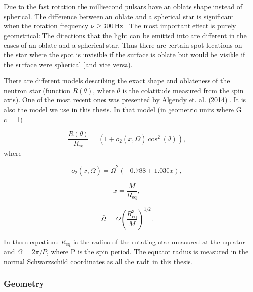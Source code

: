 \documentclass{wihuri}
\begin{document}
Due to the fast rotation the millisecond pulsars have an oblate shape instead of spherical. The difference between an oblate and a spherical star is significant when the rotation frequency $\nu \ge 300 \, \mathrm{Hz}$ \cite{cadeau}%
. The most important effect is purely geometrical: The directions that the light can be emitted into are different in the cases of an oblate and a spherical star. Thus there are certain spot locations on the star where the spot is invisible if the surface is oblate but would be visible if the surface were spherical (and vice versa).


There are different models describing the exact shape and oblateness of the neutron star (function $R(\theta)$, where $\theta$ is the colatitude measured from the spin axis).
One of the most recent ones was presented by Algendy et. al. (2014) \cite{algendy}. 
It is also the model we use in this thesis. In that model (in geometric units
where G = c = 1)

\begin{equation}
\label{rtheta2}
\frac{R(\theta)}{R_{\mathrm{eq}}} = (1 + o_{2}(x,\bar{\Omega})\cos^{2}(\theta)),
\end{equation}
where


\begin{equation}
\label{otwo}
o_{2}(x,\bar{\Omega}) = \bar{\Omega}^{2}(-0.788+1.030x),
\end{equation}


\begin{equation}
\label{rtheta2x}
x = \frac{M}{R_{\mathrm{eq}}},
\end{equation}


\begin{equation}
\label{rtheta2omega}
\bar{\Omega} = \Omega (\frac{R_{\mathrm{eq}}^{3}}{M})^{1/2}.
\end{equation}


In these equations $R_{\mathrm{eq}}$ is the radius of the rotating star measured at the equator and $\Omega = 2\pi/P$, where P is the spin period. The equator radius is measured in the normal Schwarzschild coordinates as all the radii in this thesis.


\subsubsection{Geometry}
\end{document}
